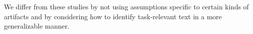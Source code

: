 We differ from these studies 
by not using assumptions 
specific to certain kinds of artifacts
and by considering how to identify task-relevant text 
in a more generalizable manner.


































